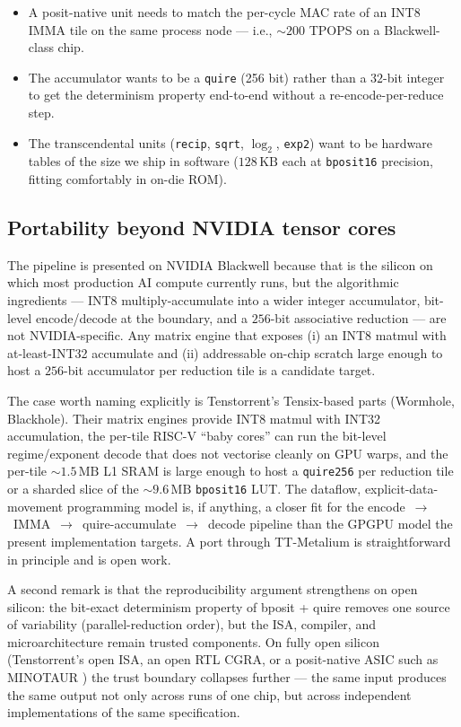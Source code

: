 \documentclass[11pt,a4paper]{article}
\newcommand{\bpsixteen}{\texttt{bposit16}}
\newcommand{\quire}{\texttt{quire}}
\newcommand{\quireTSF}{\texttt{quire256}}
\newcommand{\TPOPS}{\textsf{TPOPS}}
\begin{document}
\begin{itemize}
    \item A posit-native unit needs to match the per-cycle MAC rate
          of an INT8 IMMA tile on the same process node — i.e.,
          $\sim 200$ \TPOPS{} on a Blackwell-class chip.
    \item The accumulator wants to be a \quire{} (256 bit) rather
          than a $32$-bit integer to get the determinism property
          end-to-end without a re-encode-per-reduce step.
    \item The transcendental units (\texttt{recip}, \texttt{sqrt},
          $\log_2$, \texttt{exp2}) want to be hardware tables of the
          size we ship in software ($128\,\mathrm{KB}$ each at
          \bpsixteen{} precision, fitting comfortably in on-die ROM).
\end{itemize}

\subsection{Portability beyond NVIDIA tensor cores}
\label{sec:portability}

The pipeline is presented on NVIDIA Blackwell because that is the
silicon on which most production AI compute currently runs, but the
algorithmic ingredients --- INT8 multiply-accumulate into a wider
integer accumulator, bit-level encode/decode at the boundary, and a
$256$-bit associative reduction --- are not NVIDIA-specific.
Any matrix engine that exposes (i) an INT8 matmul with at-least-INT32
accumulate and (ii) addressable on-chip scratch large enough to host a
$256$-bit accumulator per reduction tile is a candidate target.

The case worth naming explicitly is Tenstorrent's Tensix-based parts
(Wormhole, Blackhole). Their matrix engines provide INT8 matmul with
INT32 accumulation, the per-tile RISC-V ``baby cores'' can run the
bit-level regime/exponent decode that does not vectorise cleanly on
GPU warps, and the per-tile $\sim 1.5\,\mathrm{MB}$ L1 SRAM is large
enough to host a \quireTSF{} per reduction tile or a sharded slice of
the $\sim 9.6\,\mathrm{MB}$ \bpsixteen{} LUT. The dataflow,
explicit-data-movement programming model is, if anything, a closer
fit for the encode~$\to$~IMMA~$\to$~quire-accumulate~$\to$~decode
pipeline than the GPGPU model the present implementation targets.
A port through TT-Metalium is straightforward in principle and is
open work.

A second remark is that the reproducibility argument strengthens on
open silicon: the bit-exact determinism property of bposit + quire
removes one source of variability (parallel-reduction order), but the
ISA, compiler, and microarchitecture remain trusted components. On
fully open silicon (Tenstorrent's open ISA, an open RTL CGRA, or a
posit-native ASIC such as MINOTAUR \cite{minotaur2025}) the trust
boundary collapses further --- the same input produces the same
output not only across runs of one chip, but across independent
implementations of the same specification.
\end{document}
